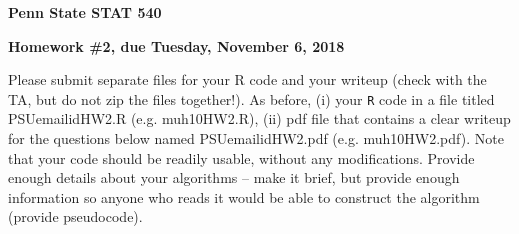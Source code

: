 \documentclass[10pt]{article}
\begin{document}
\begin{center}
{\bf Penn State STAT 540}

{\bf Homework \#2, due Tuesday, November 6, 2018}\\

\end{center}
\noindent Please submit separate files for your R code and your
writeup (check with the TA, but do not zip the files together!). As
before, (i) your {\tt R} code in a file titled PSUemailidHW2.R
(e.g. muh10HW2.R), (ii) pdf file that contains a clear writeup for the
questions below named PSUemailidHW2.pdf (e.g. muh10HW2.pdf). Note that
your code should be readily usable, without any modifications. Provide
enough details about your algorithms -- make it brief, but provide
enough information so anyone who reads it would be able to construct
the algorithm (provide pseudocode).
\end{document}
